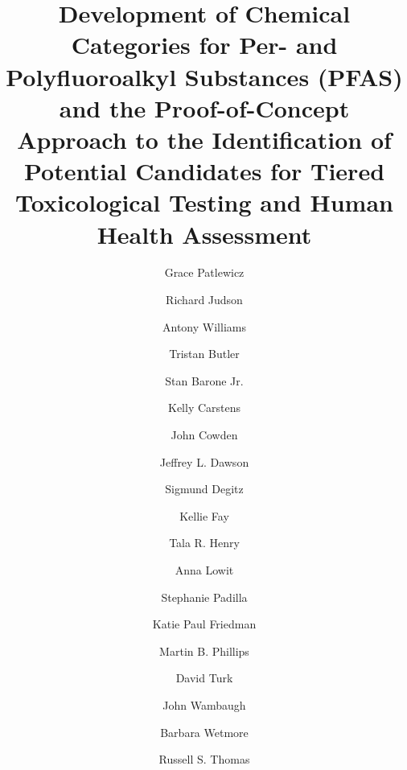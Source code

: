 \documentclass[
  super,
  preprint,
  3p]{elsarticle}
\begin{document}
\begin{frontmatter}
\title{Development of Chemical Categories for Per- and Polyfluoroalkyl
Substances (PFAS) and the Proof-of-Concept Approach to the
Identification of Potential Candidates for Tiered Toxicological Testing
and Human Health Assessment}
\author[1]{Grace Patlewicz%
%
}
\author[1]{Richard Judson%
%
}

\author[1]{Antony Williams%
%
}

\author[2]{Tristan Butler%
%
}

\author[2]{Stan Barone Jr.%
%
}

\author[1]{Kelly Carstens%
%
}

\author[1]{John Cowden%
%
}

\author[2]{Jeffrey L. Dawson%
%
}

\author[1]{Sigmund Degitz%
%
}

\author[2]{Kellie Fay%
%
}

\author[2]{Tala R. Henry%
%
}

\author[2]{Anna Lowit%
%
}

\author[1]{Stephanie Padilla%
%
}

\author[1]{Katie Paul Friedman%
%
}

\author[2]{Martin B. Phillips%
%
}

\author[2]{David Turk%
%
}

\author[1]{John Wambaugh%
%
}

\author[1]{Barbara Wetmore%
%
}

\author[1]{Russell S. Thomas%
%
}






















\end{frontmatter}
\end{document}
